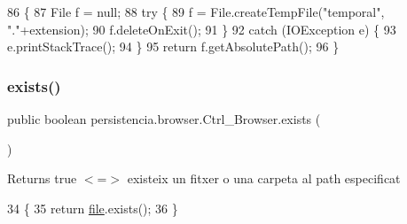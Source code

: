 \begin{DoxyCode}
86                                                           \{
87         File f = null;
88         \textcolor{keywordflow}{try} \{
89             f = File.createTempFile(\textcolor{stringliteral}{"temporal"}, \textcolor{stringliteral}{"."}+extension);
90             f.deleteOnExit();
91         \}
92         \textcolor{keywordflow}{catch} (IOException e) \{
93             e.printStackTrace();
94         \}
95         \textcolor{keywordflow}{return} f.getAbsolutePath();
96     \}
\end{DoxyCode}
\mbox{\label{classpersistencia_1_1browser_1_1Ctrl__Browser_ac79782a4f7fd5207498fe37e952f9b8b}} 
\subsubsection{\texorpdfstring{exists()}{exists()}}
{\footnotesize\ttfamily public boolean persistencia.\+browser.\+Ctrl\+\_\+\+Browser.\+exists (\begin{DoxyParamCaption}{ }\end{DoxyParamCaption})\hspace{0.3cm}{\ttfamily [inline]}}

\begin{DoxyReturn}{Returns}
true $<$=$>$ existeix un fitxer o una carpeta al path especificat 
\end{DoxyReturn}

\begin{DoxyCode}
34                             \{
35         \textcolor{keywordflow}{return} \hyperlink{classpersistencia_1_1browser_1_1Ctrl__Browser_a72c151aed575c0848f7dbb1609b373c8}{file}.exists();
36     \}
\end{DoxyCode}
\mbox{\label{classpersistencia_1_1browser_1_1Ctrl__Browser_abdabfef6639c93ac5dc64f569b5b1d36}} 
